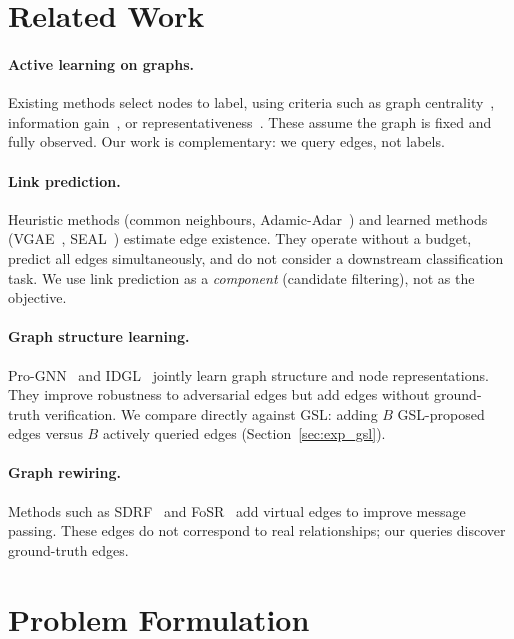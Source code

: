 \documentclass{article}
\begin{document}
\section{Related Work}
\label{sec:related}

\paragraph{Active learning on graphs.}
Existing methods select nodes to label, using criteria such as graph centrality~\cite{cai2017active}, information gain~\cite{gao2018active}, or representativeness~\cite{wu2019active}.
These assume the graph is fixed and fully observed.
Our work is complementary: we query edges, not labels.

\paragraph{Link prediction.}
Heuristic methods (common neighbours, Adamic-Adar~\cite{adamic2003friends}) and learned methods (VGAE~\cite{kipf2016variational}, SEAL~\cite{zhang2018link}) estimate edge existence.
They operate without a budget, predict all edges simultaneously, and do not consider a downstream classification task.
We use link prediction as a \emph{component} (candidate filtering), not as the objective.

\paragraph{Graph structure learning.}
Pro-GNN~\cite{jin2020graph} and IDGL~\cite{chen2020iterative} jointly learn graph structure and node representations.
They improve robustness to adversarial edges but add edges without ground-truth verification.
We compare directly against GSL: adding $B$ GSL-proposed edges versus $B$ actively queried edges (Section~\ref{sec:exp_gsl}).

\paragraph{Graph rewiring.}
Methods such as SDRF~\cite{topping2022understanding} and FoSR~\cite{karhadkar2023fosr} add virtual edges to improve message passing.
These edges do not correspond to real relationships; our queries discover ground-truth edges.


\section{Problem Formulation}
\label{sec:problem}
\end{document}
